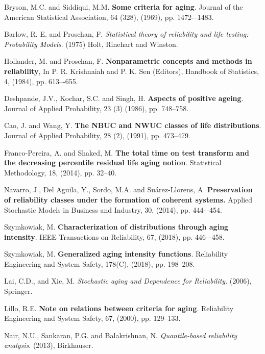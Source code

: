 \documentclass[preprint,12pt]{elsarticle}
\begin{document}
\begin{thebibliography}{}

 Bryson, M.C. and Siddiqui, M.M. \textbf{Some criteria for aging}. Journal of the American Statistical Association,  64 (328), (1969), pp. 1472-–1483. 


 Barlow, R. E. and Proschan, F. \textit{Statistical theory of reliability and life testing: Probability Models}. (1975) Holt, Rinehart and Winston.


 Hollander, M. and Proschan, F. {\bf Nonparametric concepts and methods in reliability}, In P. R. Krishnaiah and P. K. Sen (Editors), Handbook of Statistics, 4, (1984), pp. 613–-655.

 Deshpande, J.V., Kochar, S.C. and Singh, H. \textbf{Aspects of positive ageing}. Journal of Applied  Probability, 23 (3) (1986), pp. 748--758.


 Cao, J. and Wang, Y. \textbf{The NBUC and NWUC classes of life distributions}. Journal of Applied Probability, 28 (2), (1991), pp. 473--479.


 Franco-Pereira, A. and Shaked, M. \textbf{The total time on test transform and the decreasing percentile residual life aging notion}. Statistical Methodology, 18, (2014), pp. 32--40.

 Navarro, J., Del Aguila, Y., Sordo, M.A. and Su\'arez-Llorens, A. {\bf Preservation of reliability classes under the formation of coherent systems.} Applied Stochastic Models in Business and Industry, 30, (2014), pp. 444-–454.


 Szymkowiak, M.  {\bf Characterization of distributions through aging intensity}. IEEE Transactions on Reliability, 67, (2018), pp. 446–-458.

 Szymkowiak, M.  {\bf Generalized aging intensity functions}. Reliability Engineering and System Safety, 178(C), (2018), pp. 198--208.

 Lai, C.D., and Xie, M. {\it Stochastic aging and Dependence for Reliability}. (2006), Springer.

 Lillo, R.E. {\bf Note on relations between criteria for aging}. Reliability Engineering and System Safety, 67, (2000), pp. 129--133.

 Nair, N.U., Sankaran, P.G. and Balakrishnan, N. {\it Quantile-based reliability analysis}. (2013), Birkhauser.



\end{thebibliography}
\end{document}
